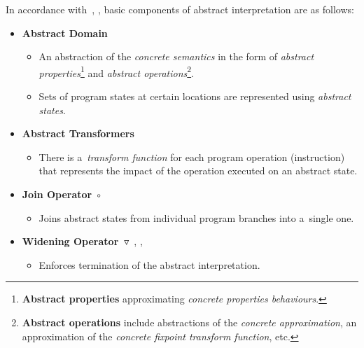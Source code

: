 In accordance with~\cite{favAI}, \cite{projectPracticeMarcin2018},
basic components of abstract interpretation are as follows:
\begin{itemize}
    \item \textbf{Abstract Domain}~\cite{AICousotWeb}
        \begin{itemize}
            \item
                An abstraction of the \emph{concrete semantics} in the form
                of \emph{abstract properties}\footnote{\textbf{Abstract
                properties} approximating \emph{concrete properties
                behaviours}.} and \emph{abstract
                operations}\footnote{\textbf{Abstract operations} include
                abstractions of the \emph{concrete approximation}, an
                approximation of the \emph{concrete fixpoint transform
                function}, etc.}.~\cite{AIBasedFormalMethodsCousot}

            \item
                Sets of program states at certain locations are represented
                using \emph{abstract states}.
        \end{itemize}

    \item \textbf{Abstract Transformers}
        \begin{itemize}
            \item
                There is a~\emph{transform function} for each program
                operation (instruction) that represents the impact
                of the operation executed on an abstract state.
        \end{itemize}

    \item \textbf{Join Operator}~$ \circ $
        \begin{itemize}
            \item
                Joins abstract states from individual program branches into
                a~single one.
        \end{itemize}

    \item
        \textbf{Widening
        Operator~$ \triangledown $}~\cite{programAnalysisNielson},
        \cite{wideningNarrowingCousot}, \cite{favAI}
        \begin{itemize}
            \item
                Enforces termination of the abstract interpretation.


\end{itemize}
\end{itemize}
